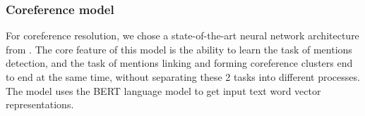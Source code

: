\documentclass[a4paper,fleqn,longmktitle]{cas-dc}
\begin{document}
\subsubsection{Coreference model}%
For coreference resolution, we chose a state-of-the-art neural network architecture from \cite{joshi2019bert}.  The core feature of this model is the ability to learn the task of mentions detection, and the task of mentions linking and forming coreference clusters end to end at the same time, without separating these 2 tasks into different processes. The model uses the BERT language model to get input text word vector representations.
\end{document}
